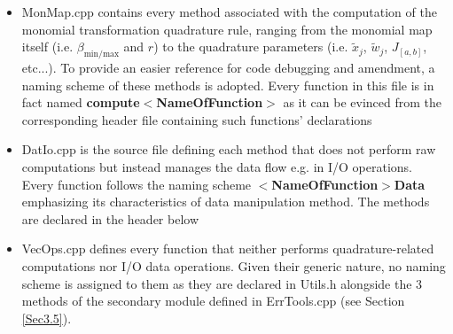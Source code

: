 \documentclass[a4paper, twosided]{book}
\begin{document}
\begin{itemize}
    \item \colorbox{poliGrayBlue}{MonMap.cpp} contains every method associated with the computation of the monomial transformation quadrature rule, ranging from the monomial map itself (i.e. $\beta_{\text{min/max}}$ and $r$) to the quadrature parameters (i.e. $\tilde{x}_j$, $\tilde{w}_j$, $J_{[a,b]}$, etc...). To provide an easier reference for code debugging and amendment, a naming scheme of these methods is adopted. Every function in this file is in fact named \color{poliDarkBlue} \textbf{compute}$\boldsymbol{<}$\textbf{NameOfFunction$\boldsymbol{>}$} \color{black} as it can be evinced from the corresponding header file containing such functions' declarations
    
    \vspace{0.2cm}
    
    \newpage
    \item \colorbox{poliGrayBlue}{DatIo.cpp} is the source file defining each method that does not perform raw computations but instead manages the data flow e.g. in I/O operations. Every function follows the naming scheme \color{poliDarkBlue} $\boldsymbol{<}$\textbf{NameOfFunction$\boldsymbol{>}$}\textbf{Data} \color{black} emphasizing its characteristics of data manipulation method. The methods are declared in the header below
    
    \vspace{0.2cm}
    \vspace{0.3cm}
    
    \item \colorbox{poliGrayBlue}{VecOps.cpp} defines every function that neither performs quadrature-related computations nor I/O data operations. Given their generic nature, no naming scheme is assigned to them as they are declared in \colorbox{poliGrayBlue}{Utils.h} alongside the $3$ methods of the secondary module defined in \colorbox{poliGrayBlue}{ErrTools.cpp} (see Section \ref{Sec3.5}).
    
    \vspace{0.15cm}
\end{itemize}
\end{document}
